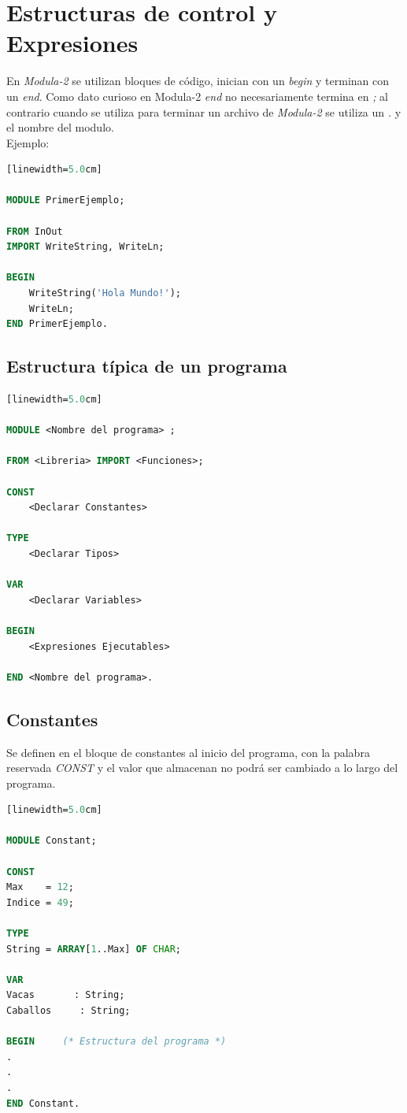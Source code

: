 \documentclass[10pt,journal,compsoc]{IEEEtran}
\begin{document}
\section{Estructuras de control y Expresiones}
En \emph{Modula-2} se utilizan bloques de c\'odigo, inician con un \emph{begin} y terminan con un \emph{end}. Como dato curioso en Modula-2 \emph{end} no necesariamente termina en \emph{;} al contrario cuando se utiliza para terminar un archivo de \emph{Modula-2} se utiliza un \emph{.} y el nombre del modulo.\\
Ejemplo:
\begin{lstlisting}[language=Modula-2, caption = {C\'odigo Hola Mundo en Modula-2}][linewidth=5.0cm]

MODULE PrimerEjemplo;

FROM InOut 
IMPORT WriteString, WriteLn;

BEGIN
	WriteString('Hola Mundo!');
	WriteLn;
END PrimerEjemplo.
\end{lstlisting}

\subsection{Estructura t\'ipica de un programa}
\begin{lstlisting}[language=Modula-2, caption = {Estructura t\'ipica de un programa en Modula-2}][linewidth=5.0cm]

MODULE <Nombre del programa> ;

FROM <Libreria> IMPORT <Funciones>;

CONST
	<Declarar Constantes>
	
TYPE
	<Declarar Tipos>
	
VAR
	<Declarar Variables>
	
BEGIN
	<Expresiones Ejecutables>
	
END <Nombre del programa>.
\end{lstlisting}

\subsection{Constantes}
Se definen en el bloque de constantes al inicio del programa, con la palabra reservada \emph{CONST} y el valor que almacenan no podr\'a ser cambiado a lo largo del programa.
\begin{lstlisting}[language=Modula-2, caption = {Declaraci\'on de Constantes}][linewidth=5.0cm]

MODULE Constant;

CONST 
Max    = 12;
Indice = 49;

TYPE  
String = ARRAY[1..Max] OF CHAR;

VAR
Vacas       : String;
Caballos     : String;

BEGIN     (* Estructura del programa *)
.
.
.
END Constant.
\end{lstlisting}
\end{document}

